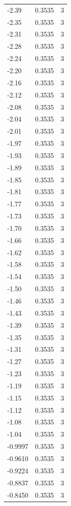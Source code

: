 \begin{longtable}{lrr}
  -2.39 & 0.3535 & 3 \\
  -2.35 & 0.3535 & 3 \\
  -2.31 & 0.3535 & 3 \\
  -2.28 & 0.3535 & 3 \\
  -2.24 & 0.3535 & 3 \\
  -2.20 & 0.3535 & 3 \\
  -2.16 & 0.3535 & 3 \\
  -2.12 & 0.3535 & 3 \\
  -2.08 & 0.3535 & 3 \\
  -2.04 & 0.3535 & 3 \\
  -2.01 & 0.3535 & 3 \\
  -1.97 & 0.3535 & 3 \\
  -1.93 & 0.3535 & 3 \\
  -1.89 & 0.3535 & 3 \\
  -1.85 & 0.3535 & 3 \\
  -1.81 & 0.3535 & 3 \\
  -1.77 & 0.3535 & 3 \\
  -1.73 & 0.3535 & 3 \\
  -1.70 & 0.3535 & 3 \\
  -1.66 & 0.3535 & 3 \\
  -1.62 & 0.3535 & 3 \\
  -1.58 & 0.3535 & 3 \\
  -1.54 & 0.3535 & 3 \\
  -1.50 & 0.3535 & 3 \\
  -1.46 & 0.3535 & 3 \\
  -1.43 & 0.3535 & 3 \\
  -1.39 & 0.3535 & 3 \\
  -1.35 & 0.3535 & 3 \\
  -1.31 & 0.3535 & 3 \\
  -1.27 & 0.3535 & 3 \\
  -1.23 & 0.3535 & 3 \\
  -1.19 & 0.3535 & 3 \\
  -1.15 & 0.3535 & 3 \\
  -1.12 & 0.3535 & 3 \\
  -1.08 & 0.3535 & 3 \\
  -1.04 & 0.3535 & 3 \\
  -0.9997 & 0.3535 & 3 \\
  -0.9610 & 0.3535 & 3 \\
  -0.9224 & 0.3535 & 3 \\
  -0.8837 & 0.3535 & 3 \\
  -0.8450 & 0.3535 & 3 \\

\end{longtable}
